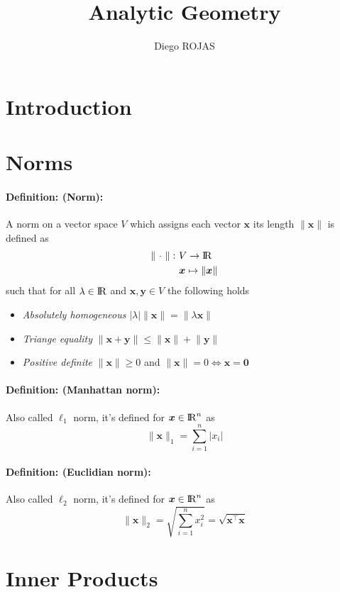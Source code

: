 \documentclass[12pt]{article}
\title{Analytic Geometry}
\author{Diego ROJAS}
\newcommand{\R}{{\rm I\!R}}
\newcommand{\bx}{{\bm{x}}}
\newcommand{\by}{{\bm{y}}}
\newcommand{\0}[0]{\bm{0}}
\newcommand{\norm}[1]{\lVert#1\rVert}
\newcommand{\xdefinition}[2]{\paragraph{\colorbox{#1!30}{\textbf{Definition:}} (#2):}}
\begin{document}
\maketitle

\section{Introduction}

\section{Norms}

\xdefinition{blue}{Norm} A norm on a vector space $V$ which assigns each vector $\bx$ its length $\norm{\bx}$ is defined as
%
\begin{equation}
\begin{aligned}
	\norm{\ \cdot \ } : \ &V \rightarrow \R \\
	                      &\bx \mapsto \norm{\bx} 
\end{aligned}
\end{equation}
%
such that for all $\lambda \in \R$ and $\bx,\by \in V$ the following holds
%
\begin{itemize}
	\item \textit{Absolutely homogeneous} $|\lambda| \norm{\bx} = \norm{\lambda \bx}$
	\item \textit{Triange equality} $\norm{\bx + \by} \leqslant \norm{\bx} + \norm{\by}$
	\item \textit{Positive definite} $\norm{\bx} \geqslant 0$ and $\norm{\bx} = 0 \iff \bx = \0$
\end{itemize}

\xdefinition{blue}{Manhattan norm} Also called $\ell_1$ norm, it's defined for $\bx \in \R^n$ as
%
\begin{equation}
	\norm{\bx}_1 = \sum\limits_{i=1}^n |x_i|
\end{equation}

\xdefinition{blue}{Euclidian norm} Also called $\ell_2$ norm, it's defined for $\bx \in \R^n$ as
%
\begin{equation}
	\norm{\bx}_2 = \sqrt{\sum\limits_{i=1}^{n} x_i^2} = \sqrt{\bx^\top \bx}
\end{equation}

\section{Inner Products}
\end{document}
